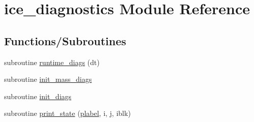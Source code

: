 \hypertarget{namespaceice__diagnostics}{
\section{ice\_\-diagnostics Module Reference}
\label{namespaceice__diagnostics}
}
\subsection*{Functions/Subroutines}
\begin{DoxyCompactItemize}
\item 
subroutine \hyperlink{namespaceice__diagnostics_a29d618a92dc5fe3345aad30da147f0b1}{runtime\_\-diags} (dt)
\item 
subroutine \hyperlink{namespaceice__diagnostics_a5bf9b233f90e5bf0702b9c358a71f42d}{init\_\-mass\_\-diags}
\item 
subroutine \hyperlink{namespaceice__diagnostics_a32eee6ddd1b9f9450d3efabd6c21a54b}{init\_\-diags}
\item 
subroutine \hyperlink{namespaceice__diagnostics_adbff5d6397108c366de11a71a997b9eb}{print\_\-state} (\hyperlink{namespaceice__diagnostics_a155e02068d3900d95eda6c6a3a52cb9f}{plabel}, i, j, iblk)
\end{DoxyCompactItemize}
